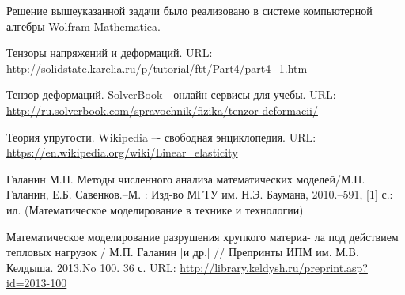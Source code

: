 \documentclass[12pt,a4paper]{article}
\begin{document}
    Решение вышеуказанной задачи было реализовано в системе компьютерной алгебры Wolfram Mathematica.

    \newpage

    \begin{thebibliography}{9}
  
       Тензоры напряжений и деформаций. URL: \url{http://solidstate.karelia.ru/p/tutorial/ftt/Part4/part4_1.htm}

       Тензор деформаций. SolverBook - онлайн сервисы для учебы. URL: \url{http://ru.solverbook.com/spravochnik/fizika/tenzor-deformacii/}

       Теория упругости. Wikipedia –- свободная энциклопедия. URL: \url{https://en.wikipedia.org/wiki/Linear_elasticity}

       Галанин М.П. Методы численного анализа математических моделей/М.П. Галанин, Е.Б. Савенков.–М. : Изд-во МГТУ им. Н.Э. Баумана, 2010.–591, [1] с.: ил. (Математическое моделирование в технике и технологии)

       Математическое моделирование разрушения хрупкого материа- ла под действием тепловых нагрузок / М.П. Галанин [и др.] // Препринты ИПМ им. М.В. Келдыша. 2013.No 100. 36 с. URL: \url{http://library.keldysh.ru/preprint.asp?id=2013-100}

    \end{thebibliography}

    
\end{document}
